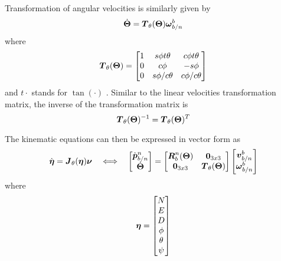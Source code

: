 Transformation of angular velocities is similarly given by 
\begin{equation}\label{eq:eulerAnglesdot}
\dot{\boldsymbol{\Theta}} = \boldsymbol{T}_{\theta}(\boldsymbol{\Theta})\boldsymbol{\omega}^b_{b/n}
\end{equation}
where
\begin{equation}
\boldsymbol{T}_{\theta}(\boldsymbol{\Theta}) = \begin{bmatrix}
1 & s\phi t\theta & c\phi t\theta \\
0 & c\phi & -s\phi \\
0 & s\phi/c\theta & c\phi/c\theta
\end{bmatrix}
\end{equation}
and $t\cdot$ stands for $\tan(\cdot)$ \citep[p. 24]{fossen2011}. Similar to the linear velocities transformation matrix, the inverse of the transformation matrix is
\begin{equation}
\boldsymbol{T}_{\theta}(\boldsymbol{\Theta})^{-1} = \boldsymbol{T}_{\theta}(\boldsymbol{\Theta})^T
\end{equation}

The kinematic equations can then be expressed in vector form as 
\begin{equation} \label{eq:kinematicsticsEuler}
\dot{\boldsymbol{\eta}} = \boldsymbol{J}_\theta(\boldsymbol{\eta})\boldsymbol{\nu}
\quad\Longleftrightarrow\quad
\begin{bmatrix}
\dot{\boldsymbol{p}}^n_{b/n} \\
\dot{\boldsymbol{\Theta}}
\end{bmatrix}
=
\begin{bmatrix}
\boldsymbol{R}^n_b(\boldsymbol{\Theta}) & \boldsymbol{0}_{3x3} \\
\boldsymbol{0}_{3x3} & \boldsymbol{T}_\theta(\boldsymbol{\Theta})
\end{bmatrix}
\begin{bmatrix}
\boldsymbol{v}^b_{b/n} \\
\boldsymbol{\omega}^b_{b/n}
\end{bmatrix}
\end{equation}
where 
\begin{equation}
\boldsymbol{\eta} = \begin{bmatrix}
N\\
E\\
D\\
\phi\\
\theta\\
\psi
\end{bmatrix}
\end{equation}


